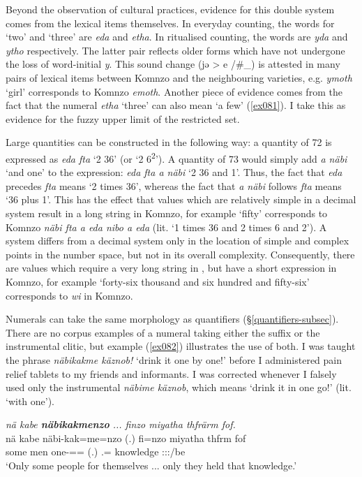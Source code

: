 Beyond the observation of cultural practices, evidence for this double system comes from the lexical items themselves. In everyday counting, the words for `two' and `three' are \emph{eda} and \emph{etha}. In ritualised counting, the words are \emph{yda} and \emph{ytho} respectively. The latter pair reflects older forms which have not undergone the loss of word-initial \emph{y}. This sound change (jə > e /\#\_) is attested in many pairs of lexical items between Komnzo and the neighbouring  varieties, e.g.  \emph{ymoth} `girl' corresponds to Komnzo \emph{emoth}. Another piece of evidence comes from the fact that the numeral \emph{etha} `three' can also mean `a few' (\ref{ex081}). I take this as evidence for the fuzzy upper limit of the restricted set.

Large quantities can be constructed in the following way: a quantity of 72 is expressed as \emph{eda fta} `2 36' (or `2 6\textsuperscript{2}'). A quantity of 73 would simply add \emph{a näbi} `and one' to the expression: \emph{eda fta a näbi} `2 36 and 1'. Thus, the fact that \emph{eda} precedes \emph{fta} means `2 times 36', whereas the fact that \emph{a näbi} follows \emph{fta} means `36 plus 1'. This has the effect that values which are relatively simple in a decimal system result in a long string in Komnzo, for example  `fifty' corresponds to Komnzo \emph{näbi fta a eda nibo a eda} (lit. `1 times 36 and 2 times 6 and 2'). A  system differs from a decimal system only in the location of simple and complex points in the number space, but not in its overall complexity. Consequently, there are values which require a very long string in , but have a short expression in Komnzo, for example `forty-six thousand and six hundred and fifty-six' corresponds to \emph{wi} in Komnzo.

Numerals can take the same morphology as quantifiers ({\S}\ref{quantifiers-subsec}). There are no corpus examples of a numeral taking either the  suffix or the instrumental  clitic, but example (\ref{ex082}) illustrates the use of both. I was taught the phrase \emph{näbikakme käznob!} `drink it one by one!' before I administered pain relief tablets to my friends and informants. I was corrected whenever I falsely used only the instrumental \emph{näbime käznob}, which means `drink it in one go!' (lit. `with one').

\begin{exe}
	\ex \emph{nä kabe \textbf{näbikakmenzo} ... finzo miyatha thfrärm fof.}\\
	\gll nä kabe näbi-kak=me=nzo (.) fi=nzo miyatha thfrm fof\\
	some men one-{\Distr}={\Ins}={\Only} (.) \Third.{\Abs}={\Only} knowledge \Stpl{}:\Sbj:\Pst:\Dur{}/be {\Emph}\\
	\trans `Only some people for themselves ... only they held that knowledge.'\\
	\label{ex082}
\end{exe}

